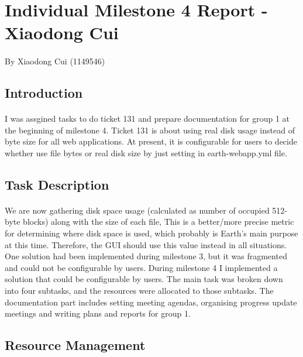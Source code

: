 \documentclass[10pt,a4,oneside]{article}
\begin{document}
\newpage
\section{Individual Milestone 4 Report - Xiaodong Cui}

\paragraph{} By Xiaodong Cui (1149546)


\subsection*{Introduction}

\paragraph{}
I was assgined tasks to do ticket 131 and prepare documentation for group 1 at the beginning of milestone 4. Ticket 131 is about using real disk usage instead of byte size for all web applications. At present, it is configurable for users to decide whether use file bytes or real disk size by just setting in earth-webapp.yml file.

\subsection*{Task Description}

\paragraph{}
We are now gathering disk space usage (calculated as number of occupied 512-byte blocks) along with the size of each file, This is a better/more precise metric for determining where disk space is used, which probably is Earth's main purpose at this time. Therefore, the GUI should use this value instead in all situations. One solution had been implemented during milestone 3, but it was fragmented and could not be configurable by users. During milestone 4 I implemented a solution that could be configurable by users. The main task was broken down into four subtasks, and the resources were allocated to those subtasks. The documentation part includes setting meeting agendas, organising progress update meetings and writing plans and reports for group 1.

\subsection*{Resource Management}
\end{document}
